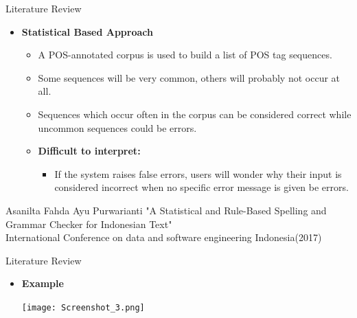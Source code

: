 \documentclass{beamer}
\begin{document}
\begin{frame}{Literature Review}
\begin{itemize}
	\item \textbf{Statistical Based Approach} \\
	\vspace{1em}
	\begin{itemize}
		\item A POS-annotated corpus is used to build a list of POS tag sequences.\\
		\vspace{0.8em}
		\item Some sequences will be very common, others will probably not occur at all. \\
		\vspace{0.8em}
		\item Sequences which occur often in the corpus can be considered correct while uncommon sequences could be errors. 
	\vspace{0.8em}
	\item \textbf{Difficult to interpret:} 
	\begin{itemize}
	\vspace{0.5em}	
	\item If the system raises false errors, users will wonder why their input is considered incorrect when no specific error message is given be errors. 
	\end{itemize}
	\end{itemize}
\end{itemize}
	\vspace{2em}
	\scriptsize \color{blue}Asanilta Fahda Ayu Purwarianti 
	\color{black} {"A Statistical and Rule-Based Spelling and Grammar Checker for Indonesian Text"}\\
	\color{blue} International Conference on data and software engineering Indonesia(2017)
\end{frame}


\begin{frame}{Literature Review}
	\begin{itemize}
		\item \textbf{Example}
\begin{center}
	\texttt{[image: Screenshot\_3.png]}	
\end{center}
\vspace{2em}
\end{itemize}
\end{frame}
\end{document}
